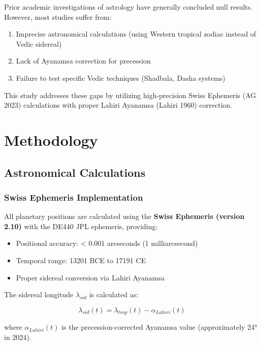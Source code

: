 \documentclass[
  11pt,
  a4paper,
  oneside,
  openany]{article}
\providecommand{\tightlist}{%
  \setlength{\itemsep}{0pt}\setlength{\parskip}{0pt}}\usepackage{longtable,booktabs,array}
\begin{document}
Prior academic investigations of astrology have generally concluded null
results. However, most studies suffer from:

\begin{enumerate}
\def\labelenumi{\arabic{enumi}.}
\tightlist
\item
  Imprecise astronomical calculations (using Western tropical zodiac
  instead of Vedic sidereal)
\item
  Lack of Ayanamsa correction for precession
\item
  Failure to test specific Vedic techniques (Shadbala, Dasha systems)
\end{enumerate}

This study addresses these gaps by utilizing high-precision Swiss
Ephemeris (AG 2023) calculations with proper Lahiri Ayanamsa (Lahiri
1960) correction.

\section{Methodology}\label{methodology}

\subsection{Astronomical Calculations}\label{astronomical-calculations}

\subsubsection{Swiss Ephemeris
Implementation}\label{swiss-ephemeris-implementation}

All planetary positions are calculated using the \textbf{Swiss Ephemeris
(version 2.10)} with the DE440 JPL ephemeris, providing:

\begin{itemize}
\tightlist
\item
  Positional accuracy: \textless{} 0.001 arcseconds (1 milliarcsecond)
\item
  Temporal range: 13201 BCE to 17191 CE
\item
  Proper sidereal conversion via Lahiri Ayanamsa
\end{itemize}

The sidereal longitude \(\lambda_{sid}\) is calculated as:

\[
\lambda_{sid}(t) = \lambda_{trop}(t) - \alpha_{Lahiri}(t)
\]

where \(\alpha_{Lahiri}(t)\) is the precession-corrected Ayanamsa value
(approximately 24° in 2024).
\end{document}
